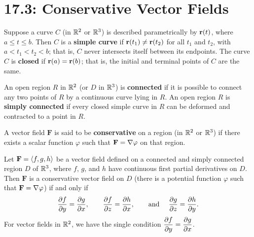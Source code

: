 \documentclass[mathNotesPreamble]{subfiles}
\begin{document}
\section{17.3: Conservative Vector Fields}

  \begin{defn*}
    Suppose a curve $C$ (in $\mathbb{R}^2$ or $\mathbb{R}^3$) is described parametrically by ${\mathbf{r}}(t)$, where $a\leq t\leq b$. Then $C$ is a \textbf{simple curve} if ${\mathbf{r}}(t_1)\neq {\mathbf{r}}(t_2)$ for all $t_1$ and $t_2$, with $a<t_1<t_2<b$; that is, $C$ never intersects itself between its endpoints. The curve $C$ is \textbf{closed} if ${\mathbf{r}}(a)={\mathbf{r}}(b)$; that is, the initial and terminal points of $C$ are the same.
  \end{defn*}

  \begin{defn*}
    An open region $R$ in $\mathbb{R}^2$ (or $D$ in $\mathbb{R}^3$) is \textbf{connected} if it is possible to connect any two points of $R$ by a continuous curve lying in $R$. An open region $R$ is \textbf{simply connected} if every closed simple curve in $R$ can be deformed and contracted to a point in $R$.
  \end{defn*}

  \begin{defn*}
    A vector field $\mathbf F$ is said to be \textbf{conservative} on a region (in $\mathbb{R}^2$ or $\mathbb{R}^3$) if there exists a scalar function $\varphi$ such that $\mathbf F=\nabla\varphi$ on that region.
  \end{defn*}

  \begin{thmBox*}
    Let $\mathbf F={\left\langle f,g,h \right\rangle}$ be a vector field defined on a connected and simply connected region $D$ of $\mathbb{R}^3$, where $f$, $g$, and $h$ have continuous first partial derivatives on $D$. Then $\mathbf F$ is a conservative vector field on $D$ (there is a potential function $\varphi$ such that $\mathbf F=\nabla \varphi$) if and only if
      \[\frac{\partial f}{\partial y}=\frac{\partial g}{\partial x},\qquad
      \frac{\partial f}{\partial z}=\frac{\partial h}{\partial x},\qquad
      \textnormal{and } \quad\frac{\partial g}{\partial z}=\frac{\partial h}{\partial y}.\]
    For vector fields in $\mathbb{R}^2$, we have the single condition $\displaystyle\frac{\partial f}{\partial y}=\frac{\partial g}{\partial x}$.
  \end{thmBox*}
\end{document}
